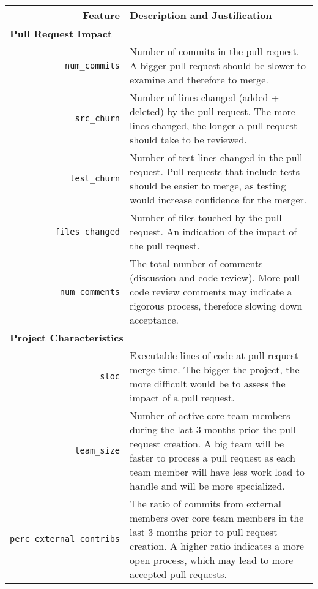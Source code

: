 \documentclass{acm_proc_article-sp}
\begin{document}
\begin{table*}
  \begin{small}
  \centering
  \begin{tabular}{rp{40em}}
    \hline
    \bf{Feature} & \bf{Description and Justification}\\
    \hline
    \multicolumn{2}{l}{\bf{Pull Request Impact}}\\
    
    \texttt{num\_commits} & Number of commits in the pull request. A bigger
    pull request should be slower to examine and therefore to merge.\\
    
    \texttt{src\_churn} & Number of lines changed (added + deleted) by the pull
    request. The more lines changed, the longer a pull request should take to be
    reviewed.\\

    \texttt{test\_churn} & Number of test lines changed in the pull request. Pull requests
    that include tests should be easier to merge, as testing would increase
    confidence for the merger.\\
    
    \texttt{files\_changed} & Number of files touched by the pull request. An
    indication of the impact of the pull request.\\
    
    \texttt{num\_comments} & The total number of comments (discussion and code
    review). More pull code review comments may indicate a rigorous process,
    therefore slowing down acceptance.\\

    \multicolumn{2}{l}{\bf{Project Characteristics}}\\
    
    \texttt{sloc} & Executable lines of code at pull request merge time. The
    bigger the project, the more difficult would be to assess the impact of
    a pull request. \\

    \texttt{team\_size} & Number of active core team members during the last
    3 months prior the pull request creation. A big team will be faster to process a
    pull request as each team member will have less work load to handle and
    will be more specialized.\\

    \texttt{perc\_external\_contribs} & The ratio of commits from external
    members over core team members in the last 3 months prior to pull request
    creation. A higher ratio indicates a more open
    process, which may lead to more accepted pull requests.\\


\end{tabular}
\end{small}
\end{table*}
\end{document}
